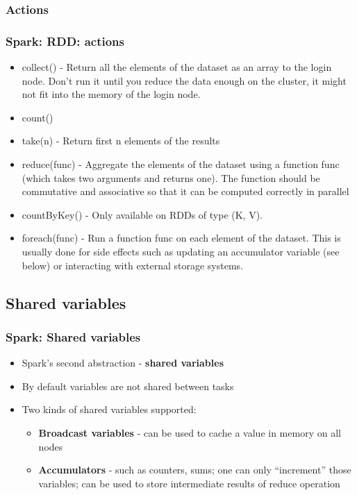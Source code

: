 \documentclass{beamer}
\begin{document}
\subsubsection{Actions}
\begin{frame}
  \frametitle{Spark: RDD: actions}
  \begin{itemize}

  \item {\color{mycolorcode}collect()} - Return all the elements of the dataset as an array to the login node. Don't run it until you reduce the data enough on the cluster, it might not fit
    into the memory of the login node.
  \item {\color{mycolorcode}count()}
  \item {\color{mycolorcode}take(n)} - Return first n elements of the results
  \item {\color{mycolorcode}reduce(func)} - Aggregate the elements of the dataset using a function func (which takes two arguments and returns one). 
    The function should be commutative and associative so that it can be computed correctly in parallel
  \item {\color{mycolorcode}countByKey()} - Only available on RDDs of type (K, V).
  \item {\color{mycolorcode}foreach(func)} - Run a function func on each element of the dataset. 
    This is usually done for side effects such as updating an accumulator variable (see below) or interacting with external storage systems.
  \end{itemize}
\end{frame}

\subsection{Shared variables}
\begin{frame}
  \frametitle{Spark: Shared variables}
  \begin{itemize}
   \item Spark's second abstraction - {\color{mycolordef}\textbf{shared variables}}
   \item By default variables are not shared between tasks
   \item Two kinds of shared variables supported:
    \begin{itemize}
      \item {\color{mycolordef}\textbf{Broadcast variables}} - can be used to cache a value in memory on all nodes
      \item {\color{mycolordef}\textbf{Accumulators}} - such as counters, sums; one can only ``increment'' those variables; can be used to store intermediate results of reduce operation
    \end{itemize}	
  \end{itemize} 
\end{frame}
\end{document}
